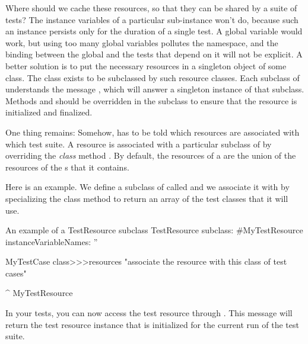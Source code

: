 \documentclass[a4paper,10pt,twoside]{book}
\begin{document}
Where should we cache these resources, so that they can be shared by a suite of tests?
The instance variables of a particular  sub-instance won't do, because such an instance persists only for the duration of a single test.
A global variable would work, but using too many global variables pollutes the namespace, and the binding between the global and the tests that depend on it will not be explicit.
A better solution is to put the necessary resources in a singleton object of some class.
The class  exists to be subclassed by such resource classes.
Each subclass of  understands the message , which will answer a singleton instance of that subclass.
Methods  and  should be overridden in the subclass to ensure that the resource is initialized and finalized.

One thing remains:
Somehow, \sunit has to be told which resources are associated with which test suite.
A resource is associated with a particular subclass of  by overriding the \emph{class} method .
By default, the resources of a  are the union of the resources of the s that it contains.

Here is an example.
We define a subclass of  called  and we associate it with  by specializing the class method  to return an array of the test classes that it will use.

\begin{classdef}[mytestresource]{An example of a TestResource subclass}
TestResource subclass: #MyTestResource
	instanceVariableNames: ''

MyTestCase class>>>resources
	"associate the resource with this class of test cases"

	^ {MyTestResource}
\end{classdef}

In your tests, you can now access the test resource through .
This message will return the test resource instance that is initialized for the current run of the test suite.
\end{document}
